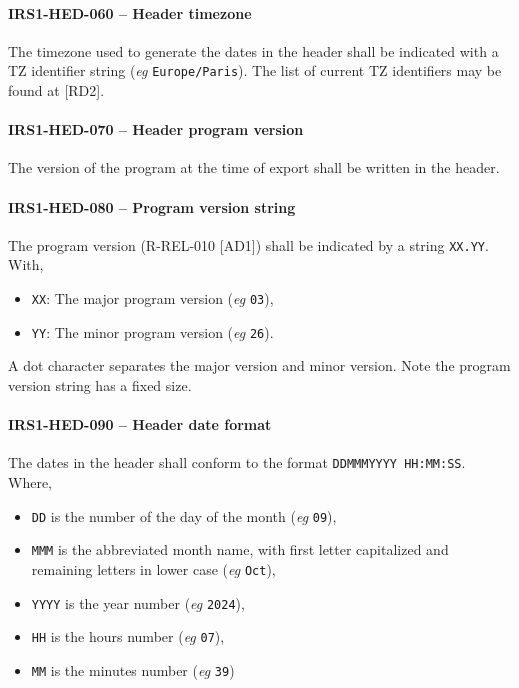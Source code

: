 \paragraph{IRS1-HED-060 -- Header timezone}
The timezone used to generate the dates in the header shall be indicated
with a TZ identifier string (\textit{eg} \lstinline{Europe/Paris}).
The list of current TZ identifiers may be found at [RD2].

\paragraph{IRS1-HED-070 -- Header program version}
The version of the program at the time of export shall be written
in the header.

\paragraph{IRS1-HED-080 -- Program version string}
The program version (R-REL-010 [AD1]) shall be indicated by a string
\lstinline{XX.YY}. With,
\begin{itemize}
\item \lstinline{XX}: The major program version (\textit{eg} \lstinline{03}),
\item \lstinline{YY}: The minor program version (\textit{eg} \lstinline{26}).
\end{itemize}

A dot character separates the major version and minor version.
Note the program version string has a fixed size.

\paragraph{IRS1-HED-090 -- Header date format}
The dates in the header shall conform to the format
\lstinline{DDMMMYYYY HH:MM:SS}.
Where,
\begin{itemize}
\item \lstinline{DD} is the number of the day of the month
  (\textit{eg} \lstinline{09}),
\item \lstinline{MMM} is the abbreviated month name, with first letter
  capitalized and remaining letters in lower case (\textit{eg} \lstinline{Oct}),
\item \lstinline{YYYY} is the year number (\textit{eg} \lstinline{2024}),
\item \lstinline{HH} is the hours number (\textit{eg} \lstinline{07}),
\item \lstinline{MM} is the minutes number (\textit{eg} \lstinline{39})
\end{itemize}

